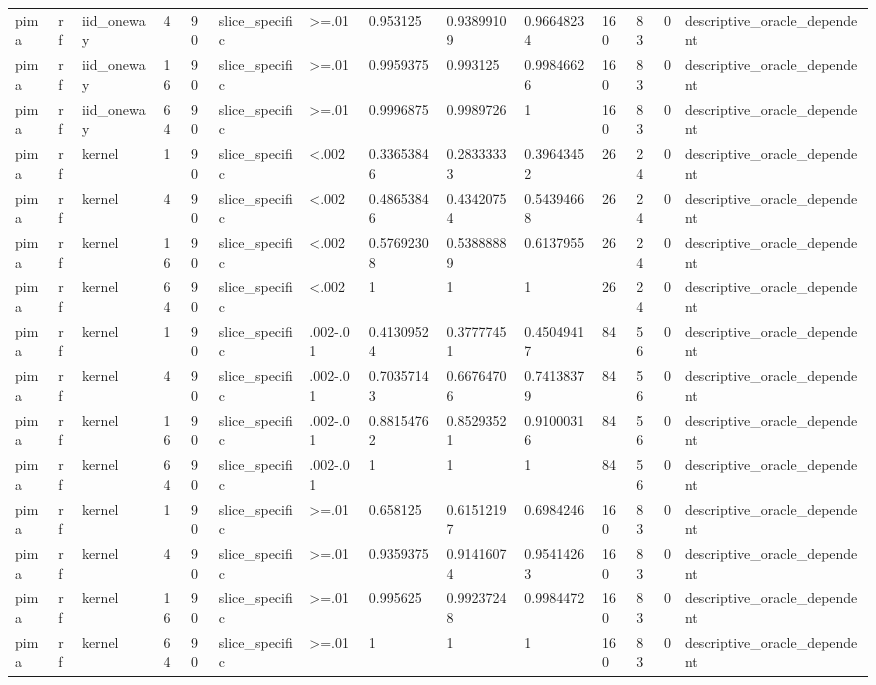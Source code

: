 \begin{tabular}{llllllllllllll}
pima & rf & iid\_oneway & 4 & 90 & slice\_specific & >=.01 & 0.953125 & 0.93899109 & 0.96648234 & 160 & 83 & 0 & descriptive\_oracle\_dependent \\
pima & rf & iid\_oneway & 16 & 90 & slice\_specific & >=.01 & 0.9959375 & 0.993125 & 0.99846626 & 160 & 83 & 0 & descriptive\_oracle\_dependent \\
pima & rf & iid\_oneway & 64 & 90 & slice\_specific & >=.01 & 0.9996875 & 0.9989726 & 1 & 160 & 83 & 0 & descriptive\_oracle\_dependent \\
pima & rf & kernel & 1 & 90 & slice\_specific & <.002 & 0.33653846 & 0.28333333 & 0.39643452 & 26 & 24 & 0 & descriptive\_oracle\_dependent \\
pima & rf & kernel & 4 & 90 & slice\_specific & <.002 & 0.48653846 & 0.43420754 & 0.54394668 & 26 & 24 & 0 & descriptive\_oracle\_dependent \\
pima & rf & kernel & 16 & 90 & slice\_specific & <.002 & 0.57692308 & 0.53888889 & 0.6137955 & 26 & 24 & 0 & descriptive\_oracle\_dependent \\
pima & rf & kernel & 64 & 90 & slice\_specific & <.002 & 1 & 1 & 1 & 26 & 24 & 0 & descriptive\_oracle\_dependent \\
pima & rf & kernel & 1 & 90 & slice\_specific & .002-.01 & 0.41309524 & 0.37777451 & 0.45049417 & 84 & 56 & 0 & descriptive\_oracle\_dependent \\
pima & rf & kernel & 4 & 90 & slice\_specific & .002-.01 & 0.70357143 & 0.66764706 & 0.74138379 & 84 & 56 & 0 & descriptive\_oracle\_dependent \\
pima & rf & kernel & 16 & 90 & slice\_specific & .002-.01 & 0.88154762 & 0.85293521 & 0.91000316 & 84 & 56 & 0 & descriptive\_oracle\_dependent \\
pima & rf & kernel & 64 & 90 & slice\_specific & .002-.01 & 1 & 1 & 1 & 84 & 56 & 0 & descriptive\_oracle\_dependent \\
pima & rf & kernel & 1 & 90 & slice\_specific & >=.01 & 0.658125 & 0.61512197 & 0.6984246 & 160 & 83 & 0 & descriptive\_oracle\_dependent \\
pima & rf & kernel & 4 & 90 & slice\_specific & >=.01 & 0.9359375 & 0.91416074 & 0.95414263 & 160 & 83 & 0 & descriptive\_oracle\_dependent \\
pima & rf & kernel & 16 & 90 & slice\_specific & >=.01 & 0.995625 & 0.99237248 & 0.9984472 & 160 & 83 & 0 & descriptive\_oracle\_dependent \\
pima & rf & kernel & 64 & 90 & slice\_specific & >=.01 & 1 & 1 & 1 & 160 & 83 & 0 & descriptive\_oracle\_dependent \\

\end{tabular}

